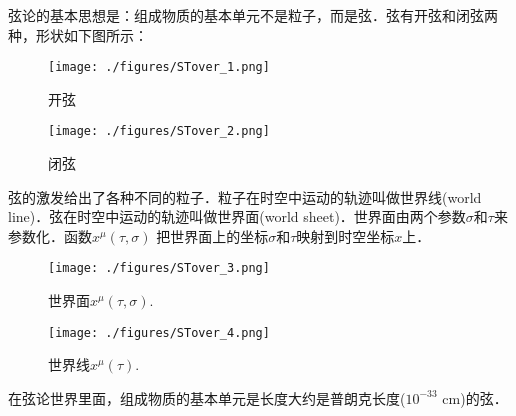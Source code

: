 弦论的基本思想是：组成物质的基本单元不是粒子，而是弦．弦有开弦和闭弦两种，形状如下图所示：
\begin{figure}[ht]
\centering
\texttt{[image: ./figures/STover\_1.png]}
\caption{开弦} \label{STover_fig1}
\end{figure}
\begin{figure}[ht]
\centering
\texttt{[image: ./figures/STover\_2.png]}
\caption{闭弦} \label{STover_fig2}
\end{figure}
弦的激发给出了各种不同的粒子．粒子在时空中运动的轨迹叫做世界线(world line)．弦在时空中运动的轨迹叫做世界面(world sheet)．世界面由两个参数$\sigma$和$\tau$来参数化．函数$x^\mu(\tau,\sigma)$ 把世界面上的坐标$\sigma$和$\tau$映射到时空坐标$x$上．

\begin{figure}[ht]
\centering
\texttt{[image: ./figures/STover\_3.png]}
\caption{世界面$x^\mu (\tau,\sigma)$.} \label{STover_fig3}
\end{figure}

\begin{figure}[ht]
\centering
\texttt{[image: ./figures/STover\_4.png]}
\caption{世界线$x^\mu(\tau)$.} \label{STover_fig4}
\end{figure}

在弦论世界里面，组成物质的基本单元是长度大约是普朗克长度($10^{-33}$ cm)的弦．